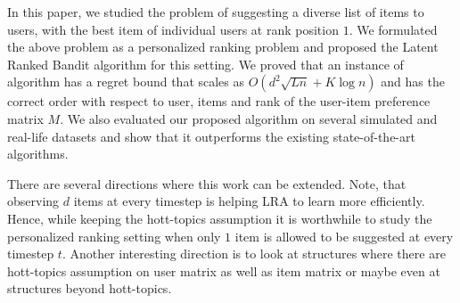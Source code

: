 In this paper, we studied the problem of suggesting a diverse list of items to users, with the best item of individual users at rank position $1$. We formulated the above problem as a personalized ranking problem and proposed the Latent Ranked Bandit algorithm for this setting. We proved that an instance of algorithm has  a regret bound that scales as $O\left(d^2\sqrt{L n} + K \log n\right)$ and has the correct order with respect to user, items and rank of the user-item preference matrix $M$. We also evaluated our proposed algorithm on several simulated and real-life datasets and show that it outperforms the existing state-of-the-art algorithms.

There are several directions where this work can be extended. Note, that observing $d$ items at every timestep is helping LRA to learn more efficiently. Hence,  while keeping the hott-topics assumption it is worthwhile to study the personalized ranking setting when only $1$ item is allowed to be suggested at every timestep $t$. Another interesting direction is to look at structures where there are hott-topics assumption on user matrix as well as item matrix or maybe even at structures beyond hott-topics.


